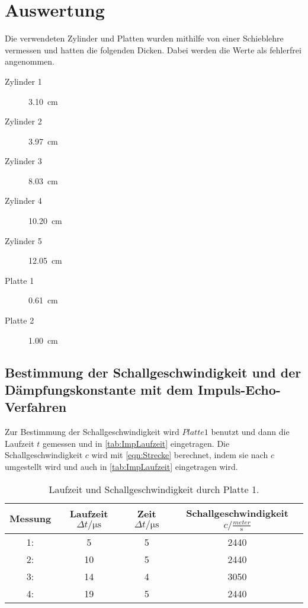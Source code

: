 \section{Auswertung}
\label{sec:Auswertung}

Die verwendeten Zylinder und Platten wurden mithilfe von einer Schieblehre vermessen und hatten die folgenden Dicken.
Dabei werden die Werte als fehlerfrei angenommen.
\begin{description}
  \item[Zylinder 1] \SI{3,10}{\centi\meter}
  \item[Zylinder 2] \SI{3,97}{\centi\meter}
  \item[Zylinder 3] \SI{8.03}{\centi\meter}
  \item[Zylinder 4] \SI{10.20}{\centi\meter}
  \item[Zylinder 5] \SI{12.05}{\centi\meter}
  \item[Platte 1] \SI{0.61}{\centi\meter}
  \item[Platte 2] \SI{1.00}{\centi\meter}
\end{description}

\subsection{Bestimmung der Schallgeschwindigkeit und der Dämpfungskonstante mit dem Impuls-Echo-Verfahren}
\label{sub:ImpEch}
Zur Bestimmung der Schallgeschwindigkeit wird $Platte 1$ benutzt und dann die Laufzeit $t$ gemessen und in \autoref{tab:ImpLaufzeit} eingetragen.
Die Schallgeschwindigkeit $c$ wird mit \autoref{eqn:Strecke} berechnet, indem sie nach $c$ umgestellt wird und auch in \autoref{tab:ImpLaufzeit} 
eingetragen wird.

\begin{table}[H]
  \centering
  \caption{Laufzeit und Schallgeschwindigkeit durch Platte 1.}
  \label{tab:ImpLaufzeit}
  \begin{tabular}{S[table-format=1.0] S[table-format=1.0] S[table-format=2.0] S[table-format=4.0] }
  \toprule
  {Messung} & {Laufzeit $\Delta t / \si{\micro\second}$} & {Zeit $\Delta t / \si{\micro\second}$} & {Schallgeschwindigkeit $c / \frac{\si{meter}}{\si{\second}}$}\\
  : &  5   & 5 & 2440  \\
  2: &  10  & 5 & 2440  \\
  3: &  14  & 4 & 3050  \\
  4: &  19  & 5 & 2440  \\
  \bottomrule
  \end{tabular}
\end{table}


